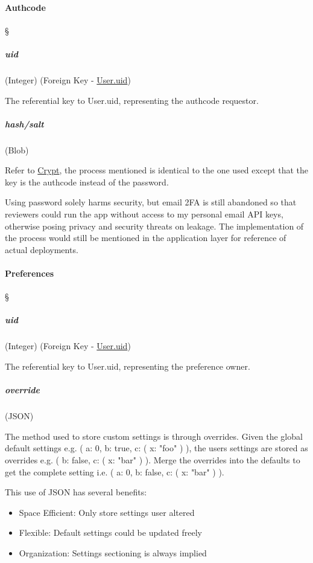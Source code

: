 \paragraph{Authcode \textdagger{}}
\S{} \label{data-layer.design.user.tables.code}

\subparagraph{uid}
(Integer) (Foreign Key - \hyperref[data-layer.design.user.tables.user.uid]{User.uid})
\label{data-layer.design.user.tables.code.uid}

The referential key to User.uid, representing the authcode requestor.

\subparagraph{hash/salt}
(Blob) \label{data-layer.design.user.tables.code.crypt}

Refer to \hyperref[data-layer.design.user.tables.pswd.crypt]{Crypt}, the process
mentioned is identical to the one used except that the key is the authcode instead
of the password.

\textdagger{} Using password solely harms security, but email 2FA is still abandoned
so that reviewers could run the app without access to my personal email API keys,
otherwise posing privacy and security threats on leakage. The implementation of the
process would still be mentioned in the application layer for reference of actual
deployments.

\paragraph{Preferences \textdagger{}}
\S{} \label{data-layer.design.user.tables.pref}

\subparagraph{uid}
(Integer) (Foreign Key -
\hyperref[data-layer.design.user.tables.user.uid]{User.uid}) \label{data-layer.design.user.tables.pref.uid}

The referential key to User.uid, representing the preference owner.

\subparagraph{override}
(JSON) \label{data-layer.design.user.tables.pref.override}

The method used to store custom settings is through overrides. Given the global
default settings e.g. ( a: 0, b: true, c: ( x: "foo" ) ), the users settings are
stored as overrides e.g. ( b: false, c: ( x: "bar" ) ). Merge the overrides into
the defaults to get the complete setting i.e. ( a: 0, b: false, c: ( x: "bar" ) ).

This use of JSON has several benefits:

\begin{itemize}
	\item Space Efficient: Only store settings user altered

	\item Flexible: Default settings could be updated freely

	\item Organization: Settings sectioning is always implied
\end{itemize}

